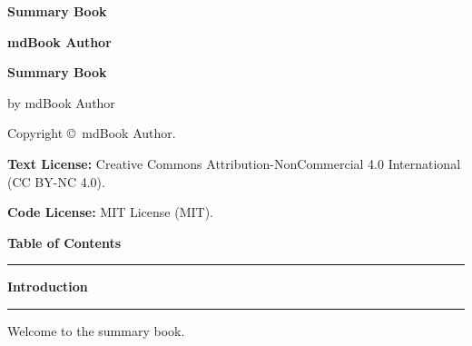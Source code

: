 \documentclass[10pt,twoside,openany]{book}
\newcommand{\currentparttitle}{Book}
\newcommand{\currentchaptitle}{Introduction}
\begin{document}
\frontmatter
\thispagestyle{empty}
\vspace*{1.1in}
{\sansbold\bfseries\fontsize{26pt}{31pt}\selectfont Summary Book\par}
\vspace{0.16in}
{\sanscond\fontsize{14pt}{18pt}\selectfont\textcolor{brandcrimson}{}\par}
\vfill
{\sansbold\bfseries\fontsize{13pt}{16pt}\selectfont mdBook Author\par}
\vspace{0.4in}
\clearpage

\thispagestyle{empty}
\vspace*{0.4in}
{\sansbold\bfseries\fontsize{11pt}{14pt}\selectfont Summary Book\par}
\noindent by mdBook Author\par
\vspace{8pt}
\noindent Copyright \copyright\ mdBook Author.\par
\vspace{8pt}
\noindent\textbf{Text License:} Creative Commons Attribution-NonCommercial 4.0 International (CC BY-NC 4.0).\par
\noindent\textbf{Code License:} MIT License (MIT).\par
\vspace{8pt}

\clearpage


\renewcommand{\currentparttitle}{Table of Contents}
\renewcommand{\currentchaptitle}{Table of Contents}
\setcounter{tocdepth}{0}
{\sansbold\bfseries\fontsize{22pt}{26pt}\selectfont\textcolor{brandcrimson}{Table of Contents}\par}
\vspace{6pt}
\noindent\textcolor{brandcrimson}{\rule{\textwidth}{0.8pt}}\par
\vspace{6pt}
\makeatletter
{}
\makeatother
\clearpage


\clearpage
{}
\renewcommand{\currentparttitle}{Front Matter}
\renewcommand{\currentchaptitle}{Introduction}
{\sansbold\bfseries\fontsize{21pt}{25pt}\selectfont\textcolor{bodyblack}{Introduction}\par}
\vspace{4pt}
\noindent\textcolor{brandcrimson}{\rule{\textwidth}{0.6pt}}\par
\vspace{8pt}

Welcome to the summary book.
\end{document}
